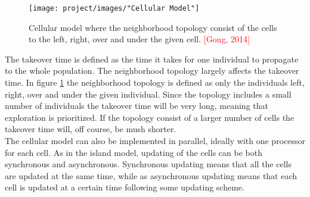\documentclass{article}
\begin{document}
\begin{figure}[h!]
\begin{center}
\texttt{[image: project/images/"Cellular Model"]}
\caption{Cellular model where the neighborhood topology consist of the cells to the left, right, over and under the given cell. \textcolor{red}{[Gong, 2014]}}
\label{Cellular model}
\end{center}
\end{figure}


\noindent The takeover time is defined as the time it takes for one individual to propagate to the whole population. The neighborhood topology largely affects the takeover time. In figure \ref{Cellular model} the neighborhood topology is defined as only the individuals left, right, over and under the given individual. Since the topology includes a small number of individuals the takeover time will be very long, meaning that exploration is prioritized. If the topology consist of a larger number of cells the takeover time will, off course, be mush shorter.\\


\noindent The cellular model can also be implemented in parallel, ideally with one processor for each cell. As in the island model, updating of the cells can be both synchronous and asynchronous. Synchronous updating means that all the cells are updated at the same time, while as asynchronous updating means that each cell is updated at a certain time following some updating scheme. 
\end{document}
